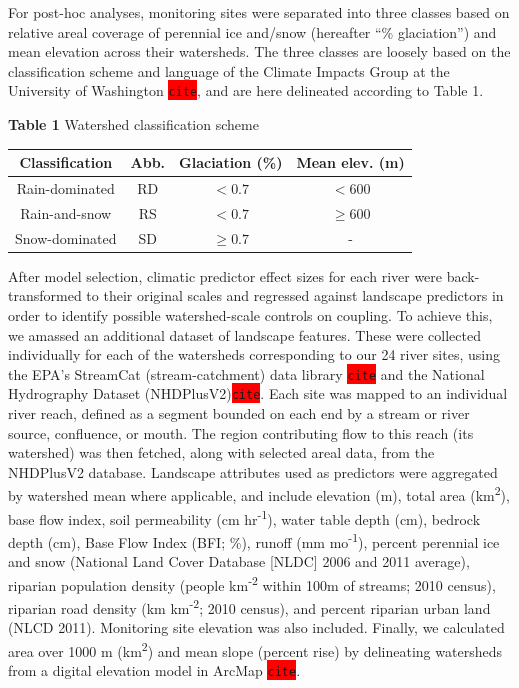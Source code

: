 \documentclass{article}
\begin{document}
For post-hoc analyses, monitoring sites were separated into three classes based on relative areal coverage of perennial ice and/snow (hereafter ``\% glaciation'') and mean elevation across their watersheds. The three classes are loosely based on the classification scheme and language of the Climate Impacts Group at the University of Washington \colorbox{red}{\lstinline{cite}}, and are here delineated according to Table 1.

\begin{center}
\textbf{Table 1} Watershed classification scheme
\end{center}
\begin{center}
\begin{tabular}{ |c|c|c|c| }
 \hline
 Classification & Abb. & Glaciation (\%) & Mean elev. (m) \\
 \hline
 Rain-dominated & RD & $< 0.7$ & $< 600$ \\
 Rain-and-snow & RS & $< 0.7$ & $\geq 600$ \\
 Snow-dominated & SD & $\geq 0.7$ & - \\
 \hline
\end{tabular}
\end{center}

After model selection, climatic predictor effect sizes for each river were back-transformed to their original scales and regressed against landscape predictors in order to identify possible watershed-scale controls on coupling. To achieve this, we amassed an additional dataset of landscape features. These were collected individually for each of the watersheds corresponding to our 24 river sites, using the EPA's StreamCat (stream-catchment) data library \colorbox{red}{\lstinline{cite}} and the National Hydrography Dataset (NHDPlusV2)\colorbox{red}{\lstinline{cite}}. Each site was mapped to an individual river reach, defined as a segment bounded on each end by a stream or river source, confluence, or mouth. The region contributing flow to this reach (its watershed) was then fetched, along with selected areal data, from the NHDPlusV2 database. Landscape attributes used as predictors were aggregated by watershed mean where applicable, and include elevation (m), total area (km\textsuperscript{2}), base flow index, soil permeability (cm hr\textsuperscript{-1}), water table depth (cm), bedrock depth (cm), Base Flow Index (BFI; \%), runoff (mm mo\textsuperscript{-1}), percent perennial ice and snow (National Land Cover Database [NLDC] 2006 and 2011 average), riparian population density (people km\textsuperscript{-2} within 100m of streams; 2010 census), riparian road density (km km\textsuperscript{-2}; 2010 census), and percent riparian urban land (NLCD 2011). Monitoring site elevation was also included. Finally, we calculated area over 1000 m (km\textsuperscript{2}) and mean slope (percent rise) by delineating watersheds from a digital elevation model in ArcMap \colorbox{red}{\lstinline{cite}}.
\end{document}
